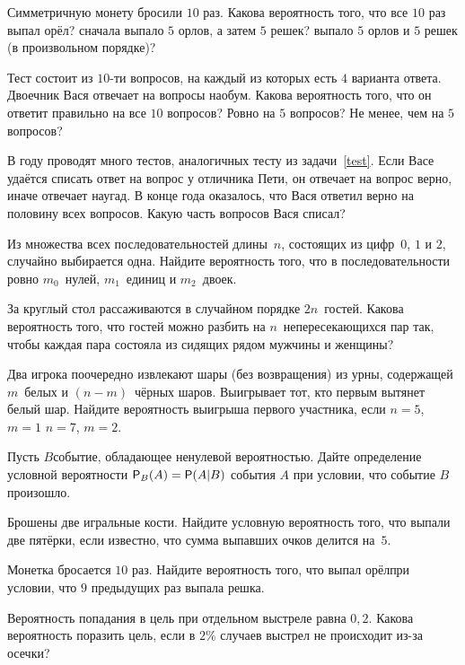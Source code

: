 \documentclass[a4paper,12pt]{article}
\renewcommand{\P}{{\sf P}}
\begin{document}
Симметричную монету бросили $10$ раз. Какова вероятность того, что
все $10$ раз выпал орёл?
сначала выпало $5$ орлов, а затем $5$ решек?
выпало $5$ орлов и $5$ решек (в произвольном порядке)?

\label{test}
Тест состоит из $10$-ти вопросов, на каждый из которых есть $4$
варианта ответа. Двоечник Вася отвечает на вопросы  наобум.
Какова вероятность того, что он ответит правильно на все $10$ вопросов?
Ровно на $5$ вопросов?
Не менее, чем на $5$ вопросов?

В году проводят много тестов, аналогичных тесту из задачи~\ref{test}. Если Васе удаётся списать ответ на вопрос у отличника Пети, он отвечает на вопрос верно, иначе отвечает наугад. В конце года оказалось, что Вася ответил верно на половину всех вопросов. Какую часть вопросов Вася списал?

Из множества всех последовательностей длины~$n$, состоящих из цифр~$0$, $1$ и $2$, случайно выбирается одна. Найдите вероятность того, что в последовательности ровно $m_0$~нулей, $m_1$~единиц и $m_2$~двоек.

За круглый стол рассаживаются в случайном порядке $2n$~гостей. Какова вероятность того, что гостей можно разбить на $n$~непересекающихся пар так, чтобы каждая пара состояла из сидящих рядом мужчины и женщины?

Два игрока поочередно извлекают шары (без возвращения) из урны, содержащей $m$~белых и $(n-m)$~чёрных шаров. Выигрывает тот, кто первым вытянет белый шар. Найдите вероятность выигрыша первого участника, если
 $n=5$, $m=1$
 $n=7$, $m=2$.

 Пусть $B$\т событие, обладающее ненулевой вероятностью. Дайте определение условной вероятности $\P_B(A) = \P(A|B)$ события $A$ при условии, что событие $B$ произошло.

Брошены две игральные кости. Найдите условную вероятность того, что выпали две пятёрки, если известно, что сумма выпавших очков делится на~$5$.

\newpage

Монетка бросается $10$ раз. Найдите вероятность того, что выпал  орёл при условии, что $9$ предыдущих раз выпала  решка.

Вероятность попадания в цель при отдельном выстреле равна $0{,}2$. Какова вероятность поразить цель, если в $2\%$ случаев выстрел не происходит из-за осечки?
\end{document}
